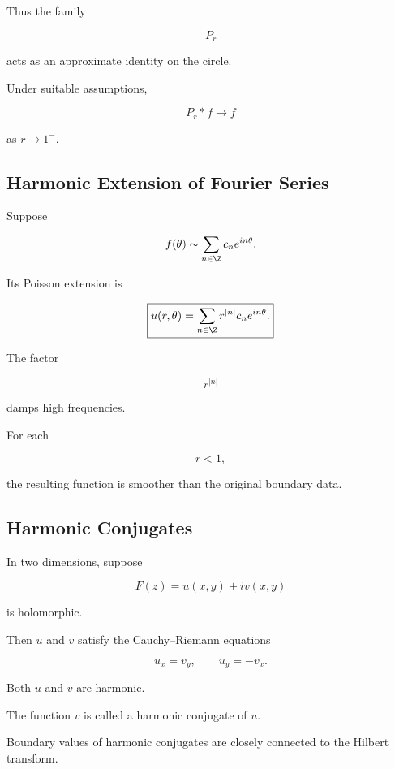 Thus the family

\[
P_r
\]

acts as an approximate identity on the circle.

Under suitable assumptions,

\[
\boxed{
P_r*f
\to
f
}
\]

as \(r\to1^-\).

\subsection{Harmonic Extension of Fourier Series}
\label{subsec:harmonic-extension-fourier}

Suppose

\[
f(\theta)
\sim
\sum_{n\in\Z}
c_ne^{in\theta}.
\]

Its Poisson extension is

\[
\boxed{
u(r,\theta)
=
\sum_{n\in\Z}
r^{|n|}
c_ne^{in\theta}.
}
\]

The factor

\[
r^{|n|}
\]

damps high frequencies.

For each

\[
r<1,
\]

the resulting function is smoother than the original boundary data.

\subsection{Harmonic Conjugates}
\label{subsec:harmonic-conjugates}

In two dimensions, suppose

\[
F(z)=u(x,y)+iv(x,y)
\]

is holomorphic.

Then \(u\) and \(v\) satisfy the Cauchy--Riemann equations

\[
\boxed{
u_x=v_y,
\qquad
u_y=-v_x.
}
\]

Both \(u\) and \(v\) are harmonic.

The function \(v\) is called a harmonic conjugate of \(u\).

Boundary values of harmonic conjugates are closely connected to the
Hilbert transform.


